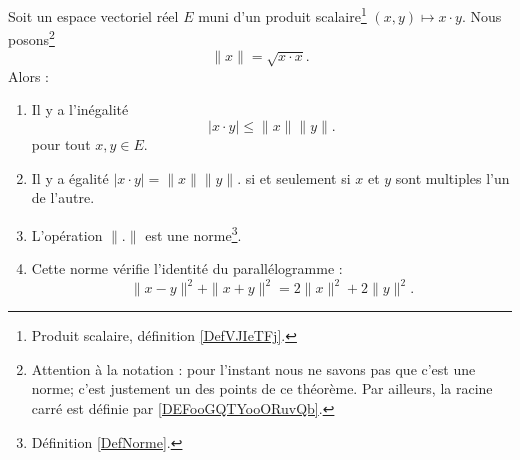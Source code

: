 \begin{theorem}      \label{ThoAYfEHG}
    Soit un espace vectoriel réel \( E\) muni d'un produit scalaire\footnote{Produit scalaire, définition \ref{DefVJIeTFj}.} \( (x,y)\mapsto x\cdot y\). Nous posons\footnote{Attention à la notation : pour l'instant nous ne savons pas que c'est une norme; c'est justement un des points de ce théorème. Par ailleurs, la racine carré est définie par \ref{DEFooGQTYooORuvQb}.}
	\begin{equation}
		\| x \|=\sqrt{ x\cdot x }.
	\end{equation}
	Alors :
	\begin{enumerate}
		\item
		      Il y a l'inégalité
		      \begin{equation}        \label{EQooZDSHooWPcryG}
			      | x\cdot y |\leq \| x \|\| y \|.
		      \end{equation}
		      pour tout \( x,y\in E\).
		\item
		      Il y a égalité \( | x\cdot y | = \| x \|\| y \|.\) si et seulement si \( x\) et \( y\) sont multiples l'un de l'autre.
		\item
		      L'opération \( \| . \|\) est une norme\footnote{Définition \ref{DefNorme}.}.
		\item
		      Cette norme vérifie l'identité du parallélogramme :
		      \begin{equation}        \label{EqYCLtWfJ}
			      \| x-y \|^2+\| x+y \|^2=2\| x \|^2+2\| y \|^2.
		      \end{equation}
	\end{enumerate}
\end{theorem}

